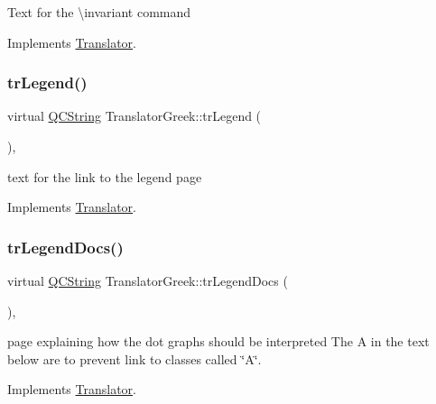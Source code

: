 Text for the \textbackslash{}invariant command 

Implements \mbox{\hyperlink{class_translator}{Translator}}.

\mbox{\label{class_translator_greek_a2b97b07324a04602c4f1a4102ab2564d}} 
\subsubsection{\texorpdfstring{trLegend()}{trLegend()}}
{\footnotesize\ttfamily virtual \mbox{\hyperlink{class_q_c_string}{Q\+C\+String}} Translator\+Greek\+::tr\+Legend (\begin{DoxyParamCaption}{ }\end{DoxyParamCaption})\hspace{0.3cm}{\ttfamily [inline]}, {\ttfamily [virtual]}}

text for the link to the legend page 

Implements \mbox{\hyperlink{class_translator}{Translator}}.

\mbox{\label{class_translator_greek_aa4677a698af31214ecc1575e141c3578}} 
\subsubsection{\texorpdfstring{trLegendDocs()}{trLegendDocs()}}
{\footnotesize\ttfamily virtual \mbox{\hyperlink{class_q_c_string}{Q\+C\+String}} Translator\+Greek\+::tr\+Legend\+Docs (\begin{DoxyParamCaption}{ }\end{DoxyParamCaption})\hspace{0.3cm}{\ttfamily [inline]}, {\ttfamily [virtual]}}

page explaining how the dot graph\textquotesingle{}s should be interpreted The A in the text below are to prevent link to classes called \char`\"{}\+A\char`\"{}. 

Implements \mbox{\hyperlink{class_translator}{Translator}}.

\mbox{\label{class_translator_greek_af54ac5af8e5297d99495009ebec00e07}} 
